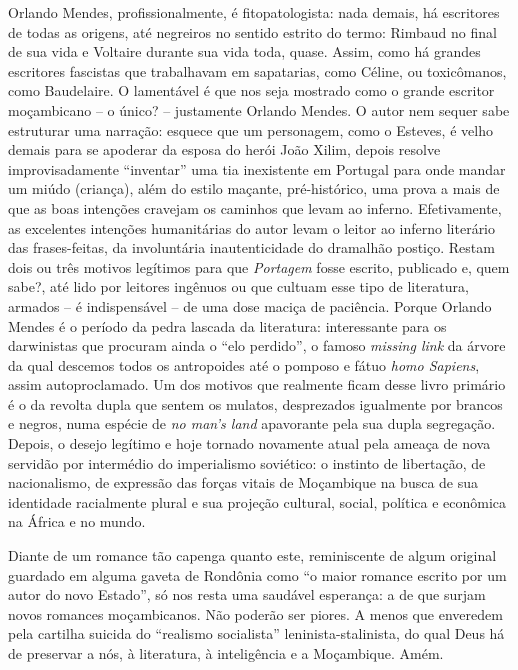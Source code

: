 \documentclass[
  letterpaper,
  DIV=11,
  numbers=noendperiod]{scrreprt}
\begin{document}
Orlando Mendes, profissionalmente, é fitopatologista: nada demais, há
escritores de todas as origens, até negreiros no sentido estrito do
termo: Rimbaud no final de sua vida e Voltaire durante sua vida toda,
quase. Assim, como há grandes escritores fascistas que trabalhavam em
sapatarias, como Céline, ou toxicômanos, como Baudelaire. O lamentável é
que nos seja mostrado como o grande escritor moçambicano -- o único? --
justamente Orlando Mendes. O autor nem sequer sabe estruturar uma
narração: esquece que um personagem, como o Esteves, é velho demais para
se apoderar da esposa do herói João Xilim, depois resolve
improvisadamente ``inventar'' uma tia inexistente em Portugal para onde
mandar um miúdo (criança), além do estilo maçante, pré-histórico, uma
prova a mais de que as boas intenções cravejam os caminhos que levam ao
inferno. Efetivamente, as excelentes intenções humanitárias do autor
levam o leitor ao inferno literário das frases-feitas, da involuntária
inautenticidade do dramalhão postiço. Restam dois ou três motivos
legítimos para que \emph{Portagem} fosse escrito, publicado e, quem
sabe?, até lido por leitores ingênuos ou que cultuam esse tipo de
literatura, armados -- é indispensável -- de uma dose maciça de
paciência. Porque Orlando Mendes é o período da pedra lascada da
literatura: interessante para os darwinistas que procuram ainda o ``elo
perdido'', o famoso \emph{missing link} da árvore da qual descemos todos
os antropoides até o pomposo e fátuo \emph{homo Sapiens}, assim
autoproclamado. Um dos motivos que realmente ficam desse livro primário
é o da revolta dupla que sentem os mulatos, desprezados igualmente por
brancos e negros, numa espécie de \emph{no man's land} apavorante pela
sua dupla segregação. Depois, o desejo legítimo e hoje tornado novamente
atual pela ameaça de nova servidão por intermédio do imperialismo
soviético: o instinto de libertação, de nacionalismo, de expressão das
forças vitais de Moçambique na busca de sua identidade racialmente
plural e sua projeção cultural, social, política e econômica na África e
no mundo.

Diante de um romance tão capenga quanto este, reminiscente de algum
original guardado em alguma gaveta de Rondônia como ``o maior romance
escrito por um autor do novo Estado'', só nos resta uma saudável
esperança: a de que surjam novos romances moçambicanos. Não poderão ser
piores. A menos que enveredem pela cartilha suicida do ``realismo
socialista'' leninista-stalinista, do qual Deus há de preservar a nós, à
literatura, à inteligência e a Moçambique. Amém.
\end{document}
